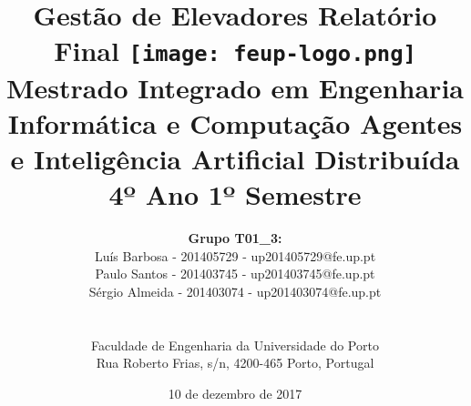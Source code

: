 \documentclass[a4paper]{article}
\begin{document}
\setlength{\textwidth}{16cm}
\setlength{\textheight}{22cm}

\title{\Huge\textbf{Gestão de Elevadores}\linebreak\linebreak\linebreak
\Large\textbf{Relatório Final}\linebreak\linebreak
\linebreak\linebreak
\texttt{[image: feup-logo.png]}\linebreak\linebreak
\linebreak\linebreak
\Large{Mestrado Integrado em Engenharia Informática e Computação} \linebreak\linebreak
\Large{Agentes e Inteligência Artificial Distribuída}\linebreak
\Large{4º Ano 1º Semestre}\linebreak\linebreak
}

\author{\textbf{Grupo T01\_3:}\\ Luís  Barbosa - 201405729 - up201405729@fe.up.pt\\ Paulo Santos - 201403745 - up201403745@fe.up.pt \\ Sérgio Almeida  - 201403074 - up201403074@fe.up.pt \\\linebreak\linebreak \\
 \\ Faculdade de Engenharia da Universidade do Porto \\ Rua Roberto Frias, s/n, 4200-465 Porto, Portugal \linebreak\linebreak\linebreak
\linebreak\linebreak\vspace{1cm}}
\date{10 de dezembro de 2017}
\maketitle
\thispagestyle{empty}

\end{document}
